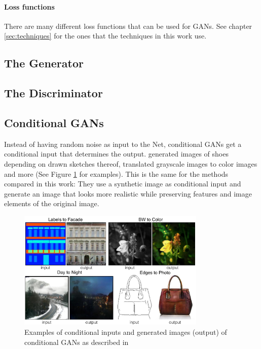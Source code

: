 \paragraph{Loss functions} There are many different loss functions that can be used for GANs. See chapter \ref{sec:techniques} for the ones that the techniques in this work use.

\subsection{The Generator}

\subsection{The Discriminator}

\subsection{Conditional GANs}
Instead of having random noise as input to the Net, conditional GANs get a conditional input that determines the output. \cite{DBLP:journals/corr/IsolaZZE16} generated images of shoes depending on drawn sketches thereof, translated grayscale images to color images and more (See Figure \ref{fig:I2I_examples} for examples). This is the same for the methods compared in this work: They use a synthetic image as conditional input and generate an image that looks more realistic while preserving features and image elements of the original image.

\begin{figure}
	\centering
	\includegraphics[width=0.8\textwidth]{../images/I2I_examples.png}
	\caption{Examples of conditional inputs and generated images (output) of conditional GANs as described in \cite{DBLP:journals/corr/IsolaZZE16}}
	\label{fig:I2I_examples}
\end{figure}


